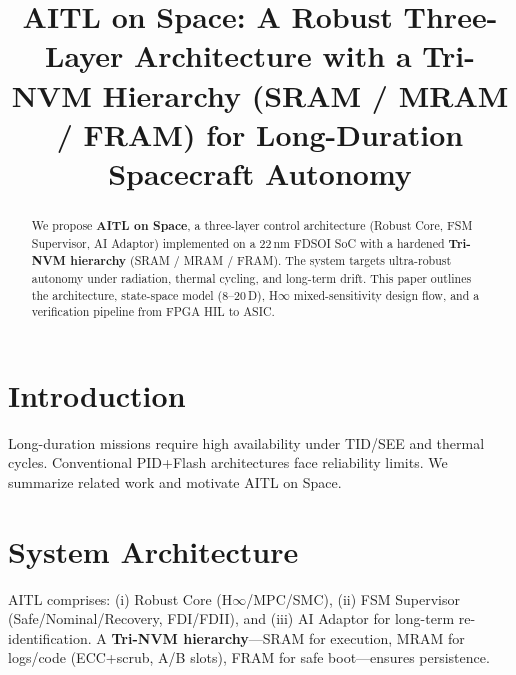 \documentclass[conference]{IEEEtran}
\title{AITL on Space: A Robust Three-Layer Architecture with a Tri-NVM Hierarchy (SRAM / MRAM / FRAM) for Long-Duration Spacecraft Autonomy}
\author{%
  \IEEEauthorblockN{Shinichi Samizo}
  \IEEEauthorblockA{Independent Semiconductor Researcher\\
  Former Engineer at Seiko Epson Corporation\\
  Email: \href{mailto:shin3t72@gmail.com}{shin3t72@gmail.com}\\
  GitHub: \url{https://github.com/Samizo-AITL}}%
}
\begin{document}
\maketitle

\begin{abstract}
We propose \textbf{AITL on Space}, a three-layer control architecture (Robust Core, FSM Supervisor, AI Adaptor) implemented on a 22\,nm FDSOI SoC with a hardened \textbf{Tri-NVM hierarchy} (SRAM / MRAM / FRAM). The system targets ultra-robust autonomy under radiation, thermal cycling, and long-term drift. This paper outlines the architecture, state-space model (8--20\,D), H$\infty$ mixed-sensitivity design flow, and a verification pipeline from FPGA HIL to ASIC.
\end{abstract}

\section{Introduction}
Long-duration missions require high availability under TID/SEE and thermal cycles. Conventional PID+Flash architectures face reliability limits. We summarize related work and motivate AITL on Space.

\section{System Architecture}
AITL comprises: (i) Robust Core (H$\infty$/MPC/SMC), (ii) FSM Supervisor (Safe/Nominal/Recovery, FDI/FDII), and (iii) AI Adaptor for long-term re-identification. A \textbf{Tri-NVM hierarchy}---SRAM for execution, MRAM for logs/code (ECC+scrub, A/B slots), FRAM for safe boot---ensures persistence.
\end{document}
